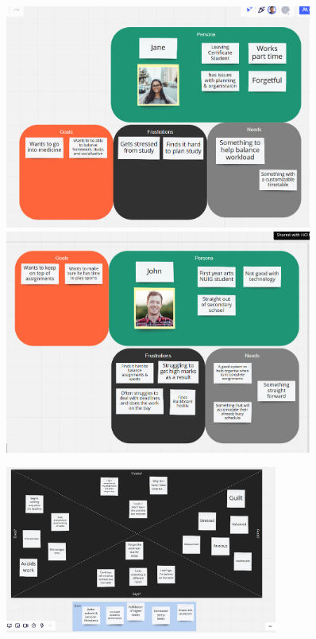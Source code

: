 \documentclass{article}
\begin{document}
		\begin{figure}[h!]
			\begin{minipage}{0.5\linewidth}
				\centering
				\includegraphics[width=0.9\textwidth]{userpersona3.jpg}
			\end{minipage}%
			\begin{minipage}{0.5\linewidth}
				\centering
				\includegraphics[width=0.9\textwidth]{userpersona4.jpg}
			\end{minipage}
		\end{figure}
		\begin{figure}[h!]
			\centering
			\includegraphics[width=0.8\textwidth]{empathymap.jpg}
		\end{figure}
\end{document}
